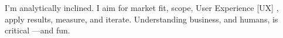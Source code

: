 
I’m analytically inclined. I aim for market fit, scope, User Experience %
{\scriptsize[UX]}
, apply results, measure, and iterate. Understanding business, and humans, is critical ---and fun.


%
 
% 
% 
% 
% 


